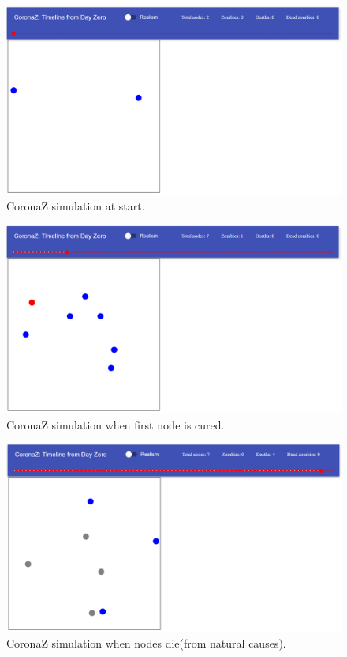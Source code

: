 \documentclass[conference]{IEEEtran}
\begin{document}
	\begin{figure}[htbp]
		\centerline{\includegraphics[width=\linewidth]{img/sim_1.png}}
		\caption{CoronaZ simulation at start.}
		\label{fig:sim_1}
	\end{figure}
	\begin{figure}[htbp]
		\centerline{\includegraphics[width=\linewidth]{img/sim_2.png}}
		\caption{CoronaZ simulation when first node is cured.}
		\label{fig:sim_2}
	\end{figure}
	\begin{figure}[htbp]
		\centerline{\includegraphics[width=\linewidth]{img/sim_3.png}}
		\caption{CoronaZ simulation when nodes die(from natural causes).}
		\label{fig:sim_3}
	\end{figure}
\end{document}
